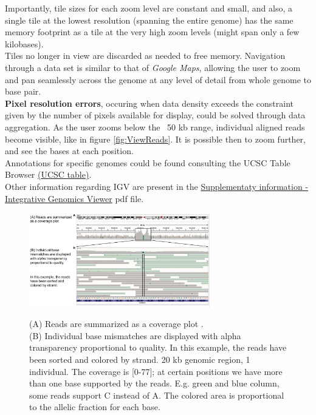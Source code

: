 Importantly, tile sizes for each zoom level are constant and small, and
also, a single tile at the lowest resolution (spanning the entire genome) has
the same memory footprint as a tile at the very high zoom levels (might span
only a few kilobases). \\
Tiles no longer in view are discarded as needed to free memory. Navigation
through a data set is similar to that of \textit{Google Maps}, allowing the user
to zoom and pan seamlessly across the genome at any level of detail from whole
genome to base pair.\\

\textbf{Pixel resolution errors}, occuring when data density exceeds the
constraint given by the number of pixels available for display, could be solved
through data aggregation. As the user zooms below the ~50 kb range, individual
aligned reads become visible, like in figure \ref{fig:ViewReads}. It is possible then to zoom further, and see the
bases at each position.\\
 
Annotations for specific genomes could be found consulting the UCSC Table
Browser \href{http://genome.ucsc.edu/cgi-bin/hgTables}{(UCSC table)}.\\

Other information regarding IGV are present in the
\href{https://authors.library.caltech.edu/72234/2/nbt.1754-S1.pdf}{Supplementaty
information - Integrative Genomics Viewer} pdf file.

\begin{figure}[H]
    \centering
    \includegraphics[width=0.7\textwidth]{IGVReadsView.PNG}
    \label{ViewReads}
    \caption{(A) Reads are summarized as a coverage plot .\\
(B) Individual base mismatches are displayed with alpha transparency proportional to quality. In this example, the reads have been sorted and colored by strand. 20 kb genomic region, 1 individual. The coverage is [0-77]; at certain positions we have more than one base supported by the reads. E.g. green and blue column, some reads support C instead of A. The colored area is proportional to the allelic fraction for each base.
}
\end{figure} 


